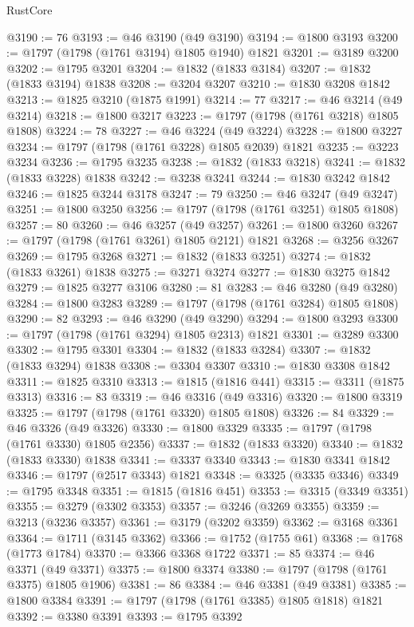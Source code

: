 \begin{lexlean}{RustCore}
\begin{coremodule}
@3190 := 76
@3193 := @46 @3190 (@49 @3190)
@3194 := @1800 @3193
@3200 := @1797 (@1798 (@1761 @3194) @1805 @1940) @1821
@3201 := @3189 @3200
@3202 := @1795 @3201
@3204 := @1832 (@1833 @3184)
@3207 := @1832 (@1833 @3194) @1838
@3208 := @3204 @3207
@3210 := @1830 @3208 @1842
@3213 := @1825 @3210 (@1875 @1991)
@3214 := 77
@3217 := @46 @3214 (@49 @3214)
@3218 := @1800 @3217
@3223 := @1797 (@1798 (@1761 @3218) @1805 @1808)
@3224 := 78
@3227 := @46 @3224 (@49 @3224)
@3228 := @1800 @3227
@3234 := @1797 (@1798 (@1761 @3228) @1805 @2039) @1821
@3235 := @3223 @3234
@3236 := @1795 @3235
@3238 := @1832 (@1833 @3218)
@3241 := @1832 (@1833 @3228) @1838
@3242 := @3238 @3241
@3244 := @1830 @3242 @1842
@3246 := @1825 @3244 @3178
@3247 := 79
@3250 := @46 @3247 (@49 @3247)
@3251 := @1800 @3250
@3256 := @1797 (@1798 (@1761 @3251) @1805 @1808)
@3257 := 80
@3260 := @46 @3257 (@49 @3257)
@3261 := @1800 @3260
@3267 := @1797 (@1798 (@1761 @3261) @1805 @2121) @1821
@3268 := @3256 @3267
@3269 := @1795 @3268
@3271 := @1832 (@1833 @3251)
@3274 := @1832 (@1833 @3261) @1838
@3275 := @3271 @3274
@3277 := @1830 @3275 @1842
@3279 := @1825 @3277 @3106
@3280 := 81
@3283 := @46 @3280 (@49 @3280)
@3284 := @1800 @3283
@3289 := @1797 (@1798 (@1761 @3284) @1805 @1808)
@3290 := 82
@3293 := @46 @3290 (@49 @3290)
@3294 := @1800 @3293
@3300 := @1797 (@1798 (@1761 @3294) @1805 @2313) @1821
@3301 := @3289 @3300
@3302 := @1795 @3301
@3304 := @1832 (@1833 @3284)
@3307 := @1832 (@1833 @3294) @1838
@3308 := @3304 @3307
@3310 := @1830 @3308 @1842
@3311 := @1825 @3310
@3313 := @1815 (@1816 @441)
@3315 := @3311 (@1875 @3313)
@3316 := 83
@3319 := @46 @3316 (@49 @3316)
@3320 := @1800 @3319
@3325 := @1797 (@1798 (@1761 @3320) @1805 @1808)
@3326 := 84
@3329 := @46 @3326 (@49 @3326)
@3330 := @1800 @3329
@3335 := @1797 (@1798 (@1761 @3330) @1805 @2356)
@3337 := @1832 (@1833 @3320)
@3340 := @1832 (@1833 @3330) @1838
@3341 := @3337 @3340
@3343 := @1830 @3341 @1842
@3346 := @1797 (@2517 @3343) @1821
@3348 := @3325 (@3335 @3346)
@3349 := @1795 @3348
@3351 := @1815 (@1816 @451)
@3353 := @3315 (@3349 @3351)
@3355 := @3279 (@3302 @3353)
@3357 := @3246 (@3269 @3355)
@3359 := @3213 (@3236 @3357)
@3361 := @3179 (@3202 @3359)
@3362 := @3168 @3361
@3364 := @1711 (@3145 @3362)
@3366 := @1752 (@1755 @61)
@3368 := @1768 (@1773 @1784)
@3370 := @3366 @3368 @1722
@3371 := 85
@3374 := @46 @3371 (@49 @3371)
@3375 := @1800 @3374
@3380 := @1797 (@1798 (@1761 @3375) @1805 @1906)
@3381 := 86
@3384 := @46 @3381 (@49 @3381)
@3385 := @1800 @3384
@3391 := @1797 (@1798 (@1761 @3385) @1805 @1818) @1821
@3392 := @3380 @3391
@3393 := @1795 @3392

\end{coremodule}
\end{lexlean}
